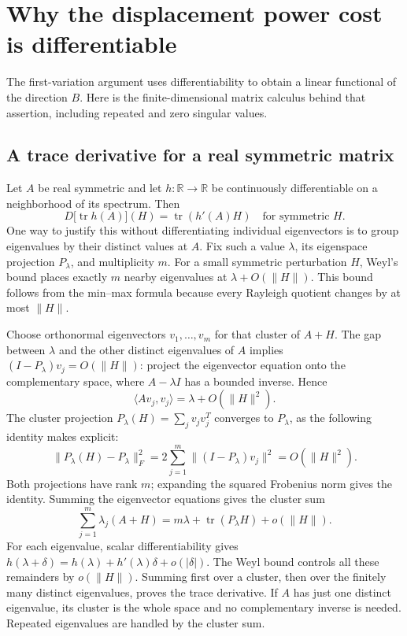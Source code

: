 \documentclass[11pt]{article}
\numberwithin{equation}{section}
\begin{document}
\appendix
\section{Why the displacement power cost is differentiable}
\label{sec:study-differentiability}

The first-variation argument uses differentiability to obtain a linear
functional of the direction $B$. Here is the finite-dimensional matrix
calculus behind that assertion, including repeated and zero singular values.

\subsection*{A trace derivative for a real symmetric matrix}
Let $A$ be real symmetric and let $h:\mathbb R\to\mathbb R$ be continuously
differentiable on a neighborhood of its spectrum. Then
\[
 D\bigl[\operatorname{tr}h(A)\bigr](H)
       =\operatorname{tr}(h'(A)H)
 \quad\text{for symmetric }H.
\]
One way to justify this without differentiating individual eigenvectors
is to group eigenvalues by their distinct values at $A$.
Fix such a value $\lambda$, its eigenspace projection $P_\lambda$, and
multiplicity $m$. For a small symmetric perturbation $H$, Weyl's bound
places exactly $m$ nearby eigenvalues at $\lambda+O(\|H\|)$.
This bound follows from the min--max formula because every Rayleigh
quotient changes by at most $\|H\|$.

Choose orthonormal eigenvectors $v_1,\ldots,v_m$ for that cluster of
$A+H$. The gap between $\lambda$ and the other distinct eigenvalues of
$A$ implies $(I-P_\lambda)v_j=O(\|H\|)$: project the eigenvector
equation onto the complementary space, where $A-\lambda I$ has a
bounded inverse. Hence
\[
 \langle Av_j,v_j\rangle=\lambda+O(\|H\|^2).
\]
The cluster projection $P_\lambda(H)=\sum_jv_jv_j^T$ converges to
$P_\lambda$, as the following identity makes explicit:
\[
 \|P_\lambda(H)-P_\lambda\|_F^2
   =2\sum_{j=1}^m\|(I-P_\lambda)v_j\|^2=O(\|H\|^2).
\]
Both projections have rank $m$; expanding the squared Frobenius norm
gives the identity. Summing the eigenvector equations gives the cluster sum
\[
 \sum_{j=1}^m\lambda_j(A+H)
   =m\lambda+\operatorname{tr}(P_\lambda H)+o(\|H\|).
\]
For each eigenvalue, scalar differentiability gives
$h(\lambda+\delta)=h(\lambda)+h'(\lambda)\delta+o(|\delta|)$.
The Weyl bound controls all these remainders by $o(\|H\|)$.
Summing first over a cluster, then over the finitely many distinct
eigenvalues, proves the trace derivative. If $A$ has just one distinct
eigenvalue, its cluster is the whole space and no complementary inverse
is needed. Repeated eigenvalues are handled by the cluster sum.
\end{document}
